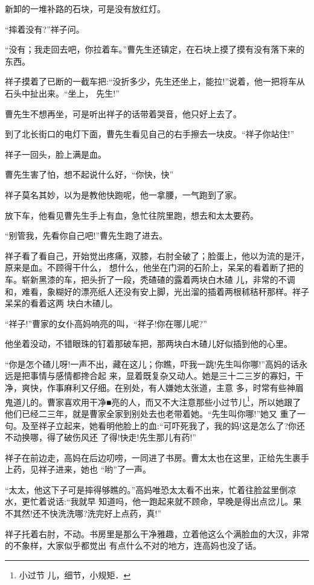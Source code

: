 \documentclass[11pt,a4paper,onecolumn]{article}
\begin{document}
新卸的一堆补路的石块，可是没有放红灯。

``摔着没有?''祥子问。

``没有；我走回去吧，你拉着车。''曹先生还镇定，在石块上摸了摸有没有落下来的东西。

祥子摸着了已断的一截车把:``没折多少，先生还坐上，能拉!''说着，他一把将车从石头中扯出来。``坐上，
先生!''

曹先生不想再坐，可是听出祥子的话带着哭音，他只好上去了。

到了北长街口的电灯下面，曹先生看见自己的右手擦去一块皮。``祥子你站住!''

祥子一回头，脸上满是血。

曹先生害了怕，想不起说什么好，``你快，快\myrule ''

祥子莫名其妙，以为是教他快跑呢，他一拿腰，一气跑到了家。

放下车，他看见曹先生手上有血，急忙往院里跑，想去和太太要药。

``别管我，先看你自己吧!''曹先生跑了进去。

祥子看了看自己，开始觉出疼痛，双膝，右肘全破了；脸蛋上，他以为流的是汗，原来是血。不顾得干什么，
想什么，他坐在门洞的石阶上，呆呆的看着断了把的车。崭新黑漆的车，把头折了一段，秃碴碴的露着两块白木碴
儿，非常的不调和，难看，象糊好的漂亮纸人还没有安上脚，光出溜的插着两根秫秸秆那样。祥子呆呆的看着这两
块白木碴儿。

``祥子!''曹家的女仆高妈响亮的叫，``祥子!你在哪儿呢?''

他坐着没动，不错眼珠的钉着那破车把，那两块白木碴儿好似插到他的心里。

``你是怎个碴儿呀!一声不出，藏在这儿；你瞧，吓我一跳!先生叫你哪!''高妈的话永远是把事情与感情都搀合起
来，显着既复杂又动人。她是三十二三岁的寡妇，干净，爽快，作事麻利又仔细。在别处，有人嫌她太张道，主意
多，时常有些神眉鬼道儿的。曹家喜欢用干净■亮的人，而又不大注意那些小过节儿\footnote{小过节
  儿，细节，小规矩．}，所以她跟了他们已经二三年，就是曹家全家到别处去也老带着她。``先生叫你哪!''她又
重了一句。及至祥子立起来，她看明他脸上的血:``可吓死我了，我的妈!这是怎么了?你还不动换哪，得了破伤风还
了得!快走!先生那儿有药!''

祥子在前边走，高妈在后边叨唠，一同进了书房。曹太太也在这里，正给先生裹手上药，见祥子进来，她也
``哟''了一声。

``太太，他这下子可是摔得够瞧的。''高妈唯恐太太看不出来，忙着往脸盆里倒凉水，更忙着说话:``我就早
知道吗，他一跑起来就不顾命，早晚是得出点岔儿。果不其然!还不快洗洗哪?洗完好上点药，真!''

祥子托着右肘，不动。书房里是那么干净雅趣，立着他这么个满脸血的大汉，非常的不象样，大家似乎都觉出
有点什么不对的地方，连高妈也没了话。
\end{document}

